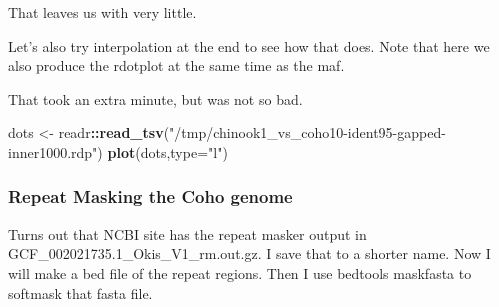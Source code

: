 \documentclass[]{krantz}
\makeatletter
\newenvironment{Shaded}{\begin{snugshade}}{\end{snugshade}}
\newcommand{\BuiltInTok}[1]{#1}
\newcommand{\CommentTok}[1]{\textcolor[rgb]{0.37,0.37,0.37}{\textit{#1}}}
\newcommand{\DataTypeTok}[1]{\textcolor[rgb]{0.27,0.27,0.27}{#1}}
\newcommand{\ExtensionTok}[1]{#1}
\newcommand{\FunctionTok}[1]{\textcolor[rgb]{0,0,0}{#1}}
\newcommand{\KeywordTok}[1]{\textcolor[rgb]{0.27,0.27,0.27}{\textbf{#1}}}
\newcommand{\NormalTok}[1]{#1}
\newcommand{\OperatorTok}[1]{\textcolor[rgb]{0.43,0.43,0.43}{\textbf{#1}}}
\newcommand{\StringTok}[1]{\textcolor[rgb]{0.5,0.5,0.5}{#1}}
\newcommand{\VariableTok}[1]{\textcolor[rgb]{0,0,0}{#1}}
\newenvironment{kframe}{%
\medskip{}
\setlength{\fboxsep}{.8em}
 \def\at@end@of@kframe{}%
 \ifinner\ifhmode%
  \def\at@end@of@kframe{\end{minipage}}%
  \begin{minipage}{\columnwidth}%
 \fi\fi%
 \def\FrameCommand##1{\hskip\@totalleftmargin \hskip-\fboxsep
 \colorbox{shadecolor}{##1}\hskip-\fboxsep
     \hskip-\linewidth \hskip-\@totalleftmargin \hskip\columnwidth}%
 \MakeFramed {\advance\hsize-\width
   \@totalleftmargin\z@ \linewidth\hsize
   \@setminipage}}%
 {\par\unskip\endMakeFramed%
 \at@end@of@kframe}
\renewenvironment{Shaded}{\begin{kframe}}{\end{kframe}}
\makeatother
\begin{document}
That leaves us with very little.

Let's also try interpolation at the end to see how that does. Note that here we also produce the
rdotplot at the same time as the maf.

\begin{Shaded}
\end{Shaded}

That took an extra minute, but was not so bad.

\begin{Shaded}
\begin{Highlighting}[]
\NormalTok{dots <-}\StringTok{ }\NormalTok{readr}\OperatorTok{::}\KeywordTok{read_tsv}\NormalTok{(}\StringTok{"/tmp/chinook1_vs_coho10-ident95-gapped-inner1000.rdp"}\NormalTok{)}
\KeywordTok{plot}\NormalTok{(dots,}\DataTypeTok{type=}\StringTok{"l"}\NormalTok{)}
\end{Highlighting}
\end{Shaded}

\hypertarget{repeat-masking-the-coho-genome}{%
\subsubsection{Repeat Masking the Coho genome}\label{repeat-masking-the-coho-genome}}

Turns out that NCBI site has the repeat masker output in GCF\_002021735.1\_Okis\_V1\_rm.out.gz.
I save that to a shorter name. Now I will make a bed file of the repeat regions. Then I use bedtools maskfasta to softmask that fasta file.

\begin{Shaded}
\end{Shaded}
\end{document}
